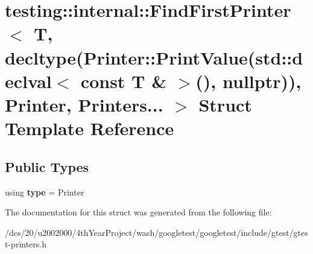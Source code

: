 \hypertarget{structtesting_1_1internal_1_1FindFirstPrinter_3_01T_00_01decltype_07Printer_1_1PrintValue_07std_17231b6251638573aa4521359a6075f3}{}\section{testing\+:\+:internal\+:\+:Find\+First\+Printer$<$ T, decltype(Printer\+:\+:Print\+Value(std\+:\+:declval$<$ const T \& $>$(), nullptr)), Printer, Printers... $>$ Struct Template Reference}
\label{structtesting_1_1internal_1_1FindFirstPrinter_3_01T_00_01decltype_07Printer_1_1PrintValue_07std_17231b6251638573aa4521359a6075f3}
\subsection*{Public Types}
\begin{DoxyCompactItemize}
\item 
\mbox{\label{structtesting_1_1internal_1_1FindFirstPrinter_3_01T_00_01decltype_07Printer_1_1PrintValue_07std_17231b6251638573aa4521359a6075f3_ad656e849bb3106118180d2b7508c6e56}} 
using {\bfseries type} = Printer
\end{DoxyCompactItemize}


The documentation for this struct was generated from the following file\+:\begin{DoxyCompactItemize}
\item 
/dcs/20/u2002000/4th\+Year\+Project/wash/googletest/googletest/include/gtest/gtest-\/printers.\+h\end{DoxyCompactItemize}
